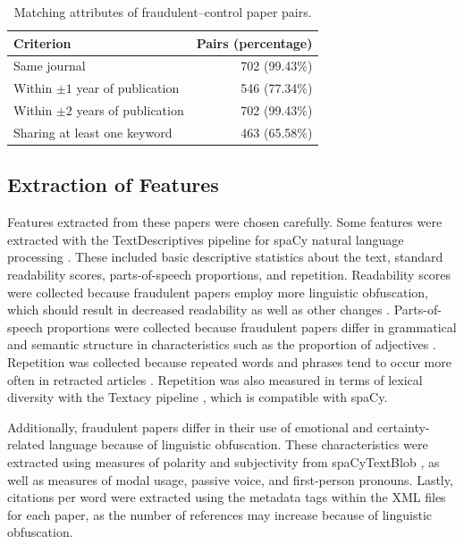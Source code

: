 \documentclass[11pt,letterpaper]{article}
\begin{document}
\begin{table}[H]
\centering
\small
\caption{Matching attributes of fraudulent--control paper pairs.}
\label{tab:pair-matching}
\begin{tabular}{lr}
\toprule
Criterion & Pairs (percentage) \\
\midrule
Same journal & 702 (99.43\%) \\
Within $\pm 1$ year of publication & 546 (77.34\%) \\
Within $\pm 2$ years of publication & 702 (99.43\%) \\
Sharing at least one keyword & 463 (65.58\%) \\
\bottomrule
\end{tabular}
\end{table}

\subsection{Extraction of Features}

Features extracted from these papers were chosen carefully. Some features were extracted with the TextDescriptives pipeline \cite{hansen2023textdescriptives} for spaCy natural language processing \cite{honnibal2020spacy}. These included basic descriptive statistics about the text, standard readability scores, parts-of-speech proportions, and repetition. Readability scores were collected because fraudulent papers employ more linguistic obfuscation, which should result in decreased readability as well as other changes \cite{markowitz2016}. Parts-of-speech proportions were collected because fraudulent papers differ in grammatical and semantic structure in characteristics such as the proportion of adjectives \cite{markowitz2014}. Repetition was collected because repeated words and phrases tend to occur more often in retracted articles \cite{bless2025}. Repetition was also measured in terms of lexical diversity with the Textacy pipeline \cite{dewilde2023textacy}, which is compatible with spaCy.

Additionally, fraudulent papers differ in their use of emotional and certainty-related language because of linguistic obfuscation. These characteristics were extracted using measures of polarity and subjectivity from spaCyTextBlob \cite{edwardes_spacytextblob,desmedt2012pattern}, as well as measures of modal usage, passive voice, and first-person pronouns. Lastly, citations per word were extracted using the metadata tags within the XML files for each paper, as the number of references may increase because of linguistic obfuscation.
\end{document}
